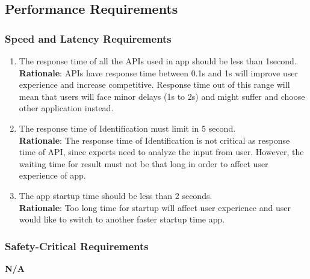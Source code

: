 
\subsection{Performance Requirements}
\label{sub:performance_requirements}

\subsubsection{Speed and Latency Requirements}
\label{ssub:speed_and_latency_requirements}
\begin{enumerate}[{PR-SL}1. ]
	\item The response time of all the APIs used in app should be less than 1second.
	\\ \textbf{Rationale}: APIs have response time between 0.1s and 1s will improve user experience and increase competitive. 	Response time out of this range will mean that users will face minor delays (1s to 2s) and might suffer and choose 	other application instead.
	\item The response time of Identification must limit in 5 second.
	\\ \textbf{Rationale}: The response time of Identification is not critical as response time of API, since experts need to analyze the 	input from user. However, the waiting time for result must not be that long in order to affect user experience of app.
	\item The app startup time should be less than 2 seconds.
	\\ \textbf{Rationale}: Too long time for startup will affect user experience and user would like to switch to another faster startup time app.
\end{enumerate}


\subsubsection{Safety-Critical Requirements}
\label{ssub:safety_critical_requirements}
	\textbf{N/A}

